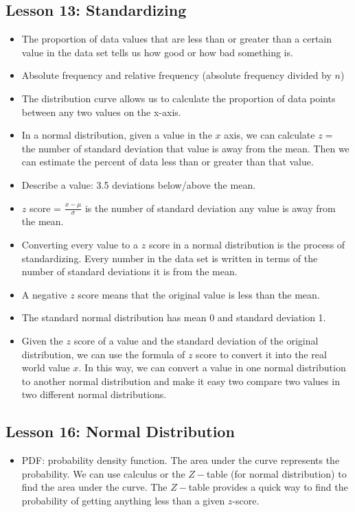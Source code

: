 \documentclass[twoside,12pt]{article}
\begin{document}
\subsection{Lesson 13: Standardizing}
\begin{itemize}
\item The proportion of data values that are less than or greater than a certain value in the data set tells us how good or how bad something is. 
\item Absolute frequency and relative frequency (absolute frequency divided by $n$)
\item The distribution curve allows us to calculate the proportion of data points between any two values on the x-axis. 
\item In a normal distribution, given a value in the $x$ axis, we can calculate $z = $ the number of standard deviation that value is away from the mean. Then we can estimate the percent of data less than or greater than that value. 
\item Describe a value: 3.5 deviations below/above the mean. 
\item $z$ score = $\frac{x - \mu}{\sigma}$ is the number of standard deviation any value is away from the mean. \item Converting every value to a $z$ score in a normal distribution is the process of standardizing. Every number in the data set is written in terms of the number of standard deviations it is from the mean.
\item A negative $z$ score means that the original value is less than the mean.
\item The standard normal distribution has mean 0 and standard deviation 1.
\item Given the $z$ score of a value and the standard deviation of the original distribution, we can use the formula of $z$ score to convert it into the real world value $x$. In this way, we can convert a value in one normal distribution to another normal distribution and make it easy two compare two values in two different normal distributions. 
\end{itemize}

\subsection{Lesson 16: Normal Distribution}
\begin{itemize}
\item PDF: probability density function. The area under the curve represents the probability. We can use calculus or the $Z-$table (for normal distribution) to find the area under the curve. The $Z-$table provides a quick way to find the probability of getting anything less than a given $z$-score. 
\end{itemize}
\end{document}
